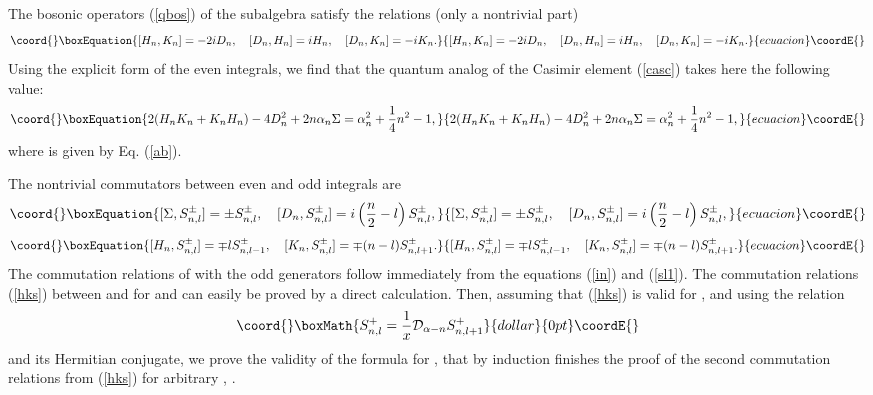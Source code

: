 \documentclass[a4paper,12pt]{article}
\begin{document}
The bosonic operators
(\ref{qbos})  of the  \coordHE{}
subalgebra satisfy the relations (only a nontrivial part)
\begin{equation}\coord{}\boxEquation{
[H_n,K_n]=-2iD_n,\quad
[D_n,H_n]=iH_n,\quad
[D_n,K_n]=-iK_n.
\label{qso}
}{
[H_n,K_n]=-2iD_n,\quad
[D_n,H_n]=iH_n,\quad
[D_n,K_n]=-iK_n.
}{ecuacion}\coordE{}\end{equation}
Using the explicit form of the even integrals,
we find that the quantum analog of the Casimir element
(\ref{casc}) takes here the following value:
\begin{equation}\coord{}\boxEquation{
2(H_nK_n+K_nH_n)-4D_n^2+2n\alpha_n \Sigma  =
\alpha_n^2+\frac{1}{4}n^2-1,
\label{qcas}
}{
2(H_nK_n+K_nH_n)-4D_n^2+2n\alpha_n \Sigma  =
\alpha_n^2+\frac{1}{4}n^2-1,
}{ecuacion}\coordE{}\end{equation}
where \coordHE{} is given by Eq. (\ref{ab}).

The nontrivial commutators between even and odd
integrals are
\begin{equation}\coord{}\boxEquation{
[\Sigma,S^\pm_{n,l}]=\pm S^\pm_{n,l},\quad
[D_n,S^\pm_{n,l}]=i\left(\frac{n}{2}-l\right)
S^\pm_{n,l},
\label{sds}
}{
[\Sigma,S^\pm_{n,l}]=\pm S^\pm_{n,l},\quad
[D_n,S^\pm_{n,l}]=i\left(\frac{n}{2}-l\right)
S^\pm_{n,l},
}{ecuacion}\coordE{}\end{equation}
\begin{equation}\coord{}\boxEquation{
[H_n,S^\pm_{n,l}]=\mp lS^\pm_{n,l-1},\quad
[K_n,S^\pm_{n,l}]=\mp (n-l)S^\pm_{n,l+1}.
\label{hks}
}{
[H_n,S^\pm_{n,l}]=\mp lS^\pm_{n,l-1},\quad
[K_n,S^\pm_{n,l}]=\mp (n-l)S^\pm_{n,l+1}.
}{ecuacion}\coordE{}\end{equation}
The commutation relations of \coordHE{} with the
odd generators
follow immediately from
the equations (\ref{in}) and (\ref{sl1}).
The commutation relations (\ref{hks})
between \coordHE{} and \coordHE{} for
\coordHE{} and \coordHE{} can easily be proved by a direct
calculation. Then, assuming that (\ref{hks}) is valid for
\coordHE{}, and using the relation
$$\coord{}\boxMath{
S^+_{n,l}=\frac{1}{x}{\cal D}_{\alpha -n}S^+_{n,l+1}
}{dollar}{0pt}\coordE{}$$
and its Hermitian conjugate, we prove the validity
of the formula for \coordHE{}, that by induction
finishes the proof of the second commutation relations
from (\ref{hks}) for arbitrary
\coordHE{}, \coordHE{}.
\end{document}
